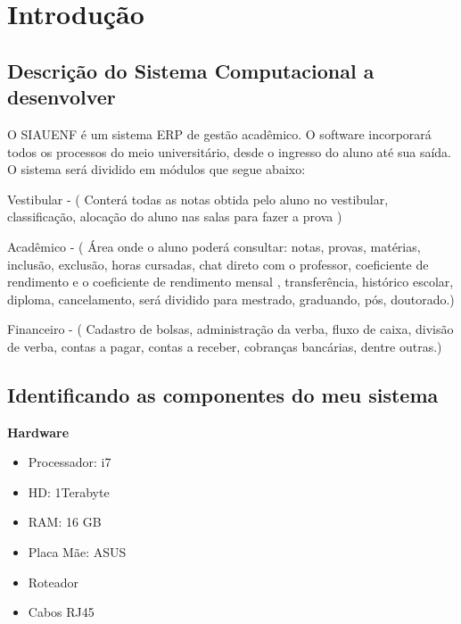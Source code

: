 


\chapter{ Introdu\c{c}\~{a}o }


   \section{Descri\c{c}\~{a}o do Sistema Computacional a desenvolver}

     O SIAUENF é um sistema ERP de gestão acadêmico. O software incorporará todos os processos do meio universitário, desde o ingresso do aluno até sua saída. O sistema será dividido em módulos que segue abaixo:

     Vestibular - ( Conterá todas as notas obtida pelo aluno no vestibular, classificação, alocação do aluno nas salas para fazer a prova )

Acadêmico - ( Área onde o aluno poderá consultar: notas, provas, matérias, inclusão, exclusão, horas cursadas, chat direto com o professor, coeficiente de rendimento e o coeficiente de rendimento mensal , transferência, histórico escolar, diploma, cancelamento, será dividido para mestrado, graduando, pós, doutorado.)

Financeiro - ( Cadastro de bolsas, administração da verba, fluxo de caixa, divisão de verba, contas a pagar, contas a receber, cobranças bancárias, dentre outras.)




   \section{Identificando as componentes do meu sistema}
   

     
     
    \textbf{Hardware}
     \begin{itemize}
         \item Processador: i7
         \item HD: 1Terabyte
         \item RAM: 16 GB
         \item Placa Mãe: ASUS
        \item Roteador
       \item Cabos RJ45
   \end{itemize}
     

